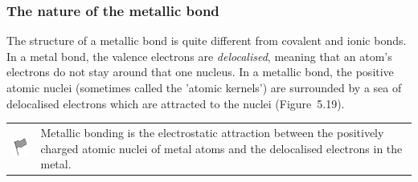             \subsubsection{ The nature of the metallic bond}
            \nopagebreak
        \label{m38694*id142901}The structure of a metallic bond is quite different from covalent and ionic bonds. In a metal bond, the valence electrons are \textsl{delocalised}, meaning that an atom's electrons do not stay around that one nucleus. In a metallic bond, the positive atomic nuclei (sometimes called the 'atomic kernels') are surrounded by a sea of delocalised electrons which are attracted to the nuclei (Figure~5.19).\par 
\label{m38694*fhsst!!!underscore!!!id582}\begin{definition}
	  \begin{tabular*}{15 cm}{m{15 mm}m{}}
	\hspace*{-50pt}  \includegraphics[width=0.5in]{col11305.imgs/psflag2.png}   & \Definition{   \label{id2431026}\textbf{ Metallic bond }} { \label{m38694*meaningfhsst!!!underscore!!!id582}
        Metallic bonding is the electrostatic attraction between the positively charged atomic nuclei of metal atoms and the delocalised electrons in the metal.
         } 
      \end{tabular*}
      \end{definition}
    \setcounter{subfigure}{0}
